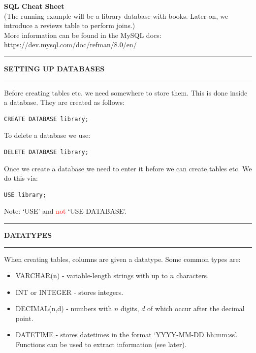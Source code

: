 \documentclass[8pt]{extarticle}
\newcommand{\heading}[1]{%
    \noindent
    \rule{\linewidth}{0.4pt}
    \begin{center}
        \vspace{-1ex}
        \textbf{#1}        
        \vspace{-2.5ex}
    \end{center}
    \rule{\linewidth}{0.4pt}
}
\begin{document}
\thispagestyle{empty} 

\begin{center}   
{\huge\textbf{SQL Cheat Sheet}}\\
\vspace*{0.25cm}
(The running example will be a library database with books. Later on, we introduce a reviews table to perform joins.)\\
\vspace*{0.1cm}
More information can be found in the MySQL docs: https://dev.mysql.com/doc/refman/8.0/en/
\vspace*{0.5cm}
\end{center}

\begin{multicols}{4}
\setlength{\columnseprule}{1pt} %


\heading{SETTING UP DATABASES}

Before creating tables etc. we need somewhere to store them. This is done inside a database. They are created as follows:

\vspace{0.5ex}
\begin{lstlisting}[style=sql]
CREATE DATABASE library;
\end{lstlisting}
\vspace{0.5ex}

To delete a database we use:

\vspace{0.5ex}
\begin{lstlisting}[style=sql]
DELETE DATABASE library;
\end{lstlisting}
\vspace{0.5ex}

Once we create a database we need to enter it before we can create tables etc. We do this via:

\vspace{0.5ex}
\begin{lstlisting}[style=sql]
USE library;
\end{lstlisting}
\vspace{0.5ex}

Note: `USE' and \textcolor{red}{not} `USE DATABASE'.\\

\heading{DATATYPES}

When creating tables, columns are given a datatype. Some common types are:
\begin{itemize}[leftmargin=*]
    \item VARCHAR(n) - variable-length strings with up to $n$ characters.
    \item INT or INTEGER - stores integers.
    \item DECIMAL(n,d) - numbers with $n$ digits, $d$ of which occur after the decimal point.
    \item DATETIME - stores datetimes in the format `YYYY-MM-DD hh:mm:ss'. Functions can be used to extract information (see later).
\end{itemize}


\end{multicols}
\end{document}
